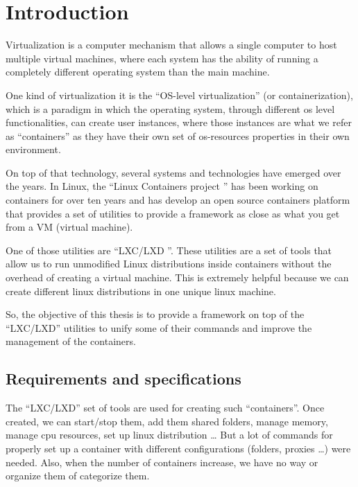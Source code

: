 
\clearpage\section{Introduction}\label{sec:introduction}         %

Virtualization is a computer mechanism that allows a single computer to host multiple virtual machines, where each system has the ability of running a completely different operating system than the main machine. 

One kind of virtualization it is the ``OS-level virtualization'' (or containerization), which is a paradigm in which the operating system, through different os level functionalities, can create user instances, where those instances are what we refer as ``containers'' as they have their own set of os-resources properties in their own environment.

On top of that technology, several systems and technologies have emerged over the years. In Linux, the ``Linux Containers project \cite{linux-containers}'' has been working on containers for over ten years and has develop an open source containers platform that provides a set of utilities to provide a framework as close as what you get from a VM (virtual machine). 

One of those utilities are ``LXC/LXD \cite{lxc}\cite{lxd}''. These utilities are a set of tools that allow us to run unmodified Linux distributions inside containers without the overhead of creating a virtual machine. This is extremely helpful because we can create different linux distributions in one unique linux machine.

So, the objective of this thesis is to provide a framework on top of the ``LXC/LXD'' utilities to unify some of their commands and improve the management of the containers.

\bigskip

\subsection{Requirements and specifications}
\label{ssec:requirements}
The ``LXC/LXD'' set of tools are used for creating such ``containers''. Once created, we can start/stop them, add them shared folders, manage memory, manage cpu resources, set up linux distribution \dots
But a lot of commands for properly set up a container with different configurations (folders, proxies \dots) were needed. Also, when the number of containers increase, we have no way or organize them of categorize them.

